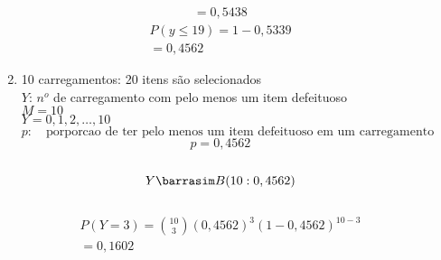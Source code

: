 \documentclass[11pt,a4paper]{book}
\begin{document}
\begin{description}
\begin{enumerate}[label=(\alph*)]
\begin{align*}
            =0,5438
          \end{align*}
          \begin{align*}
            P(y\le 19)=1-0,5339\\
            =0,4562
          \end{align*}
        \item 10 carregamentos: 20 itens são selecionados \\
          $Y$: $n^o$ de carregamento com pelo menos um item defeituoso \\
          $M=10$\\
          $Y=0,1,2,\ldots,10$\\
          $p:\quad \text{porporcao de ter pelo menos um item defeituoso em um carregamento}$\\
          $$p=0,4562$$\\
          $$Y \barrasim B(10:0,4562)$$\\
          \begin{align*}
            P(Y=3)=\binom{10}{3}(0,4562)^3 (1-0,4562)^{10-3}\\
            =0,1602
          \end{align*}
      \end{enumerate}
    \end{description}
\end{document}
